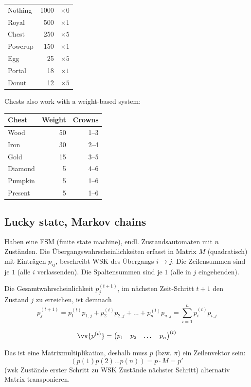 \documentclass[parskip=half]{scrartcl}
\renewcommand{\vec}[1]{\vv{#1}}
\begin{document}
\begin{tabular}{lrr}
  Nothing & 1000 & $\times 0$ \\
  Royal & 500 & $\times 1$ \\
  Chest & 250 & $\times 5$ \\
  Powerup & 150 & $\times 1$ \\
  Egg & 25 & $\times 5$ \\
  Portal & 18 & $\times 1$ \\
  Donut & 12 & $\times 5$ \\
\end{tabular}

Chests also work with a weight-based system:

\begin{tabular}{lrr}
  Chest   & Weight & Crowns \\
  \hline
  Wood    & 50 & 1--3 \\
  Iron    & 30 & 2--4 \\
  Gold    & 15 & 3--5 \\
  Diamond &  5 & 4--6 \\
  Pumpkin &  5 & 1--6 \\
  Present &  5 & 1--6 \\
\end{tabular}

\subsection{Lucky state, Markov chains}
Haben eine FSM (finite state machine), endl. Zustandsautomaten mit $n$ Zuständen.
Die Übergangswahrscheinlichkeiten erfasst in Matrix $M$ (quadratisch) mit Einträgen $p_{ij}$, beschreibt WSK des Übergangs $i \rightarrow j$.
Die Zeilensummen sind je $1$ (alle $i$ verlassenden). Die Spaltensummen sind je $1$ (alle in $j$ eingehenden).

Die Gesamtwahrscheinlichkeit $p_j^{(t+1)}$, im nächsten Zeit-Schritt $t+1$ den Zustand $j$ zu erreichen, ist demnach
\[ p_j^{(t+1)} = p_1^{(t)}p_{1,j} + p_2^{(t)}p_{2,j} + \dots +  p_n^{(t)}p_{n,j} = \sum_{i=1}^n p_i^{(t)}p_{i,j} \]

\[ \vec{p^{(t)}} = \begin{pmatrix}p_1 & p_2 & \dots & p_n \end{pmatrix}^{(t)} \]

Das ist eine Matrixmultiplikation, deshalb muss $p$ (bzw. $\pi$) ein Zeilenvektor sein:
\[ (p(1) p(2) \dots p(n)) = p \cdot M = p\prime \]
(wsk Zustände erster Schritt zu WSK Zustände nächster Schritt)
alternativ Matrix transponieren.
\end{document}
